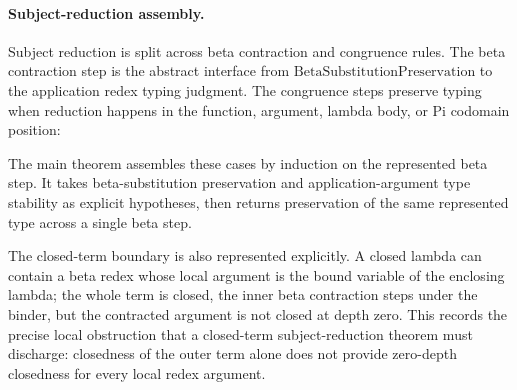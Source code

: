 \paragraph{Subject-reduction assembly.}
Subject reduction is split across beta contraction and congruence rules. The
beta contraction step is the abstract interface from
$\mathrm{BetaSubstitutionPreservation}$ to the application redex typing
judgment. The congruence steps preserve typing when reduction happens in the
function, argument, lambda body, or Pi codomain position:

The main theorem assembles these cases by induction on the represented beta
step. It takes beta-substitution preservation and application-argument type
stability as explicit hypotheses, then returns preservation of the same
represented type across a single beta step.

The closed-term boundary is also represented explicitly. A closed lambda can
contain a beta redex whose local argument is the bound variable of the enclosing
lambda; the whole term is closed, the inner beta contraction steps under the
binder, but the contracted argument is not closed at depth zero. This records
the precise local obstruction that a closed-term subject-reduction theorem must
discharge: closedness of the outer term alone does not provide zero-depth
closedness for every local redex argument.
